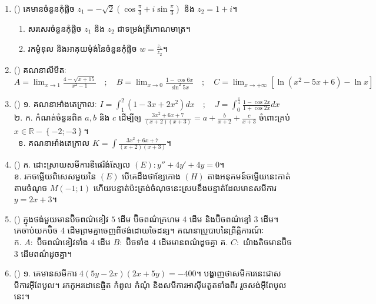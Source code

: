 \documentclass{officialexam}
\begin{document}
\begin{enumerate}[I]
	\item  {\color{khtug}()} គេមានចំនួនកុំផ្លិច $z_1=-\sqrt{2}\left(\cos\frac{\pi}{3}+i\sin\frac{\pi}{3}\right)$ និង $z_2=1+i$។
	\begin{enumerate}[k,2]
		\item សរសេរចំនួនកុំផ្លិច $z_1$ និង $z_2$ ជាទម្រង់ត្រីកោណមាត្រ។
		\item រកម៉ូឌុល និងអាគុយម៉ុង់នៃចំនួនកុំផ្លិច $w=\frac{z_1}{z_2}$។
	\end{enumerate}
	\item {\color{khtug}()} គណនាលីមីតៈ $A=\lim_{x\to1}\frac{4-\sqrt{x+15}}{x^2-1}\quad;\quad B=\lim_{x\to0}\frac{1-\cos6x}{\sin^{2}5x}\quad;\quad C=\lim_{x\to+\infty}\left[\ln\left(x^2-5x+6\right)-\ln x\right]$
	\item {\color{khtug}()} {\color{khtug}១.} គណនាអាំងតេក្រាលៈ $I=\int_{1}^{2}\left(1-3x+2x^2\right)dx\quad;\quad J=\int_{0}^{\frac{\pi}{4}}\frac{1-\cos2x}{1+\cos2x}dx$\\
	{\color{khtug}២.} {\color{khtug}ក.} កំណត់ចំនួនពិត $a,b$ និង $c$ ដើម្បីឲ្យ $\frac{3x^2+6x+7}{\left(x+2\right)\left(x+3\right)}=a+\frac{b}{x+2}+\frac{c}{x+3}$ ចំពោះគ្រប់ $x\in\mathbb{R}-\left \{-2;-3\right \}$។\\
	{\color{khtug}\quad~ខ.} គណនាអាំងតេក្រាល $K=\int\frac{3x^2+6x+7}{\left(x+2\right)\left(x+3\right)}$។
	\item {\color{khtug}()} {\color{khtug}ក.} ដោះស្រាយសមីការឌីផេរ៉ង់ស្យែល $\left(E\right): y''+4y'+4y=0$។\\
	{\color{khtug}ខ.} រកចម្លើយពិសេសមួយនៃ $(E)$ បើគេដឹងថាខ្សែកោង $(H)$ តាងអនុគមន៍ចម្លើយនេះកាត់តាមចំណុច $M\left(-1;1\right)$ ហើយបន្ទាត់ប៉ះត្រង់ចំណុចនេះស្របនឹងបន្ទាត់ដែលមានសមីការ $y=2x+3$។
	\item {\color{khtug}()} ក្នុងថង់មួយមានប៊ិចពណ៌ខៀវ $5$ ដើម ប៊ិចពណ៌ក្រហម $4$ ដើម និងប៊ិចពណ៌ខ្មៅ $3$ ដើម។\\
	គេចាប់យកប៊ិច $4$ ដើមព្រមគ្នាចេញពីថង់ដោយចៃដន្យ។ គណនាប្រូបាបនៃព្រឹត្តិការណ៍ៈ\\
	{\color{khtug}ក.} $A:$ ប៊ិចពណ៌ខៀវទាំង $4$ ដើម $B:$ ប៊ិចទាំង $4$ ដើមមានពណ៌ដូចគ្នា\quad
	{\color{khtug}គ.} $C:$ យ៉ាងតិចមានប៊ិច $3$ ដើមពណ៌ដូចគ្នា។
	\item {\color{khtug}()} {\color{khtug}១.} គេមានសមីការ $4\left(5y-2x\right)\left(2x+5y\right)=-400$។ បង្ហាញថាសមីការនេះជាសមីការអុីពែបូល។ រកកូអរដោនេផ្ចិត កំពូល កំណុំ និងសមីការអាសុីមតូតទាំងពីរ រួចសង់អុីពែបូលនេះ។\\

\end{enumerate}
\end{document}

